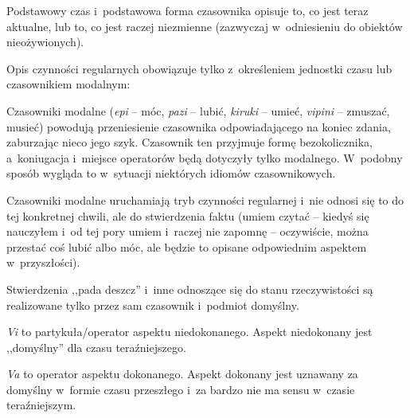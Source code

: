 \begin{spacing}{1.1}
Podstawowy czas i~podstawowa forma czasownika opisuje to, co jest teraz 
aktualne, lub to, co jest raczej niezmienne (zazwyczaj w~odniesieniu do 
obiektów nieożywionych).


Opis czynności regularnych obowiązuje tylko z~określeniem jednostki czasu lub
 czasownikiem modalnym:




Czasowniki modalne (\emph{epi} -- móc, \emph{pazi} -- lubić, \emph{kiruki} -- 
umieć, \emph{vipini} -- zmuszać, musieć) powodują przeniesienie czasownika 
odpowiadającego na koniec zdania, zaburzając nieco jego szyk. Czasownik ten 
przyjmuje formę bezokolicznika, a~koniugacja i~miejsce operatorów będą dotyczyły
tylko modalnego. W~podobny sposób wygląda to w~sytuacji niektórych idiomów 
czasownikowych.



Czasowniki modalne uruchamiają tryb czynności regularnej i~nie odnosi się to do 
tej konkretnej chwili, ale do stwierdzenia faktu (umiem czytać -- kiedyś się 
nauczyłem i~od tej pory umiem i~raczej nie zapomnę -- oczywiście, można przestać
coś lubić albo móc, ale będzie to opisane odpowiednim aspektem w~przyszłości).

Stwierdzenia ,,pada deszcz'' i~inne odnoszące się do stanu rzeczywistości są 
realizowane tylko przez sam czasownik i~podmiot domyślny.



\emph{Vi} to partykuła/operator aspektu niedokonanego. Aspekt niedokonany jest 
,,domyślny'' dla czasu teraźniejszego.




\emph{Va} to operator aspektu dokonanego. Aspekt dokonany jest uznawany za 
domyślny w~formie czasu przeszłego i~za bardzo nie ma sensu w~czasie 
teraźniejszym.


\end{spacing}
